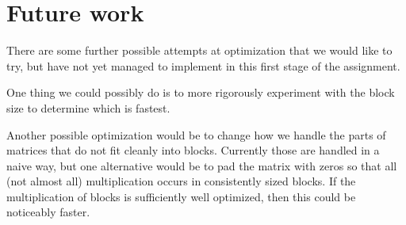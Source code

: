 \section{Future work}\label{sec:future}
There are some further possible attempts at optimization that we would like to
try, but have not yet managed to implement in this first stage of the
assignment.

One thing we could possibly do is to more rigorously experiment with the block
size to determine which is fastest.

Another possible optimization would be to change how we handle the parts of
matrices that do not fit cleanly into blocks. Currently those are handled in a
naive way, but one alternative would be to pad the matrix with zeros so that
all (not almost all) multiplication occurs in consistently sized blocks. If the
multiplication of blocks is sufficiently well optimized, then this could be
noticeably faster.

